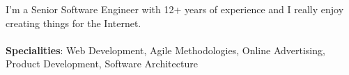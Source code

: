 
\begin{cvparagraph}
I’m a Senior Software Engineer with 12+ years of experience and I really enjoy creating things for the Internet.\\\\
\textbf{Specialities}: Web Development, Agile Methodologies, Online Advertising, Product Development, Software Architecture
\end{cvparagraph}

